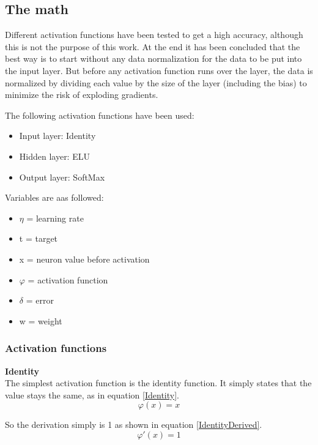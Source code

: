 \documentclass[11pt]{article}
\begin{document}
\newpage
\subsection{The math}
Different activation functions have been tested to get a high accuracy, although this is not the purpose of this work. At the end it has been concluded that the best way is to start without any data normalization for the data to be put into the input layer. But before any activation function runs over the layer, the data is normalized by dividing each value by the size of the layer (including the bias) to minimize the risk of exploding gradients\cite{DBLP:journals/corr/IoffeS15}.

The following activation functions have been used:
\begin{itemize}
\item Input layer: Identity
\item Hidden layer: ELU\cite{DBLP:journals/corr/ClevertUH15}
\item Output layer: SoftMax
\end{itemize}

Variables are aas followed:
\begin{itemize}
\item $\eta$ = learning rate
\item t = target
\item x = neuron value before activation
\item $\varphi$ = activation function
\item $\delta$ = error
\item w = weight
\end{itemize}

\subsubsection{Activation functions}

\textbf{Identity}\\
The simplest activation function is the identity function. It simply states that the value stays the same, as in equation \eqref{Identity}.
\begin{equation}
\label{Identity}
\varphi(x) = x
\end{equation}

So the derivation simply is 1 as shown in equation \eqref{IdentityDerived}.
\begin{equation}
\label{IdentityDerived}
\varphi'(x) = 1
\end{equation}
\end{document}
